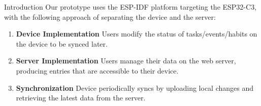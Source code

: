 \documentclass[final, cmyk]{beamer}
\newlength{\colwidth}
\begin{document}
\begin{frame}[t]
\begin{columns}[t]
\begin{column}{\colwidth}
\begin{block}{Introduction}
        Our prototype uses the ESP-IDF platform targeting the ESP32-C3,
        with the following approach of separating the device and the 
        server:

        \begin{enumerate}
          \item \textbf{Device Implementation} Users modify the status of 
            tasks/events/habits on the device to be synced later.
          \item \textbf{Server Implementation} Users manage their data on the
            web server, producing entries that are accessible to their device.
          \item \textbf{Synchronization} Device periodically syncs by uploading
            local changes and retrieving the latest data from the server. 
        \end{enumerate}

      \end{block}


\end{column}
\end{columns}
\end{frame}
\end{document}
